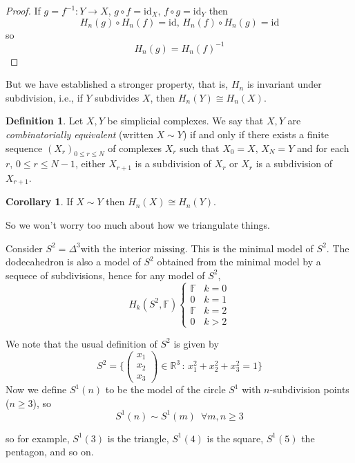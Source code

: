 \documentclass[a4paper,14pt]{extarticle}
\theoremstyle{definition}
\newtheorem*{definition}{Definition}
\newtheorem*{corollary}{Corollary}
\begin{document}
\begin{proof}
	If $g=f^{-1}:Y\rightarrow X$, $g\circ f=\text{id}_X, \,f\circ g=\text{id}_Y$ then
	\[H_n(g)\circ H_n(f)=\text{id}, \,H_n(f)\circ H_n(g)=\text{id}\] so
	\[H_n(g)=H_n(f)^{-1}\]
\end{proof}

But we have established a stronger property, that is, $H_n$ is invariant under subdivision,
i.e., if $Y$ subdivides $X$, then $H_n(Y)\cong H_n(X)$.

\begin{definition}
	Let $X,Y$ be simplicial complexes. We say that $X,Y$ are \emph{combinatorially equivalent}
	(written $X\sim Y$) if and only if there exists a finite sequence $(X_r)_{0\leq r\leq N}$ of
	complexes $X_r$ such that $X_0=X, \,X_N=Y$ and for each $r, \,0\leq r\leq N-1$, either
	$X_{r+1}$ is a subdivision of $X_r$ or $X_r$ is a subdivision of $X_{r+1}$.
\end{definition}

\begin{corollary}
	If $X\sim Y$ then $H_n(X)\cong H_n(Y)$.
\end{corollary}

\noindent So we won't worry too much about how we triangulate things.

\vspace{12pt}

Consider $S^2=\Delta^3\text {with the interior missing}$. This is the minimal model
of $S^2$. The dodecahedron is also a model of $S^2$ obtained from the minimal model
by a sequece of subdivisions, hence for any model of $S^2$,
\[H_k(S^2,\mathbb{F})
	\begin{cases}
		\mathbb{F}&k=0\\0&k=1\\\mathbb{F}&k=2\\0&k>2
	\end{cases}\] 

We note that the usual definition of $S^2$ is given by 
\[S^2=\{\begin{pmatrix}x_1\\x_2\\x_3\end{pmatrix}\in\mathbb{R}^3\,:\,
x_1^2+x_2^2+x_3^2=1\}\] Now we define $S^1(n)$ to be the model of the circle $S^1$ with
$n$-subdivision points ($n\geq3$), so \[S^1(n)\sim S^1(m)\,\,\,\forall m,n\geq3\]

so for example, $S^1(3)$ is the triangle, $S^1(4)$ is the square, $S^1(5)$ the pentagon, and so on.
\end{document}
